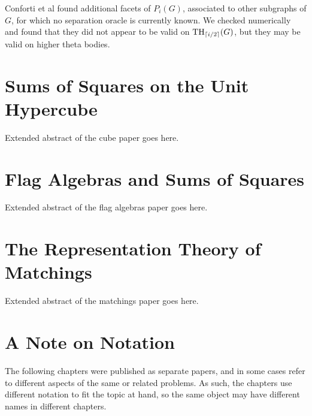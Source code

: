 Conforti et al \cite{conforti} found additional facets of $P_i(G)$, associated
to other subgraphs of $G$, for which no separation oracle is currently known. We
checked numerically and found that they did not appear to be valid on
$\textup{TH}_{\lceil i/2\rceil}(G)$, but they may be valid on higher theta bodies.




\section{Sums of Squares on the Unit Hypercube}

Extended abstract of the cube paper goes here.

\section{Flag Algebras and Sums of Squares}

Extended abstract of the flag algebras paper goes here.

\section{The Representation Theory of Matchings}

Extended abstract of the matchings paper goes here.

\section{A Note on Notation}
The following chapters were published as separate papers, and in some cases
refer to different aspects of the same or related problems. As such, the 
chapters use different notation to fit the topic at hand, so the same object
may have different names in different chapters.
